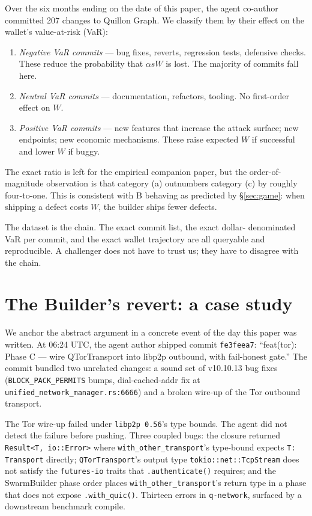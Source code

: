 \documentclass[11pt,a4paper]{article}
\begin{document}
Over the six months ending on the date of this paper, the agent
co-author committed 207 changes to Quillon Graph. We classify them
by their effect on the wallet's value-at-risk (VaR):
\begin{enumerate}[label=(\alph*),leftmargin=1.8em]
  \item \emph{Negative VaR commits} --- bug fixes, reverts, regression
  tests, defensive checks. These reduce the probability that
  $\alpha s W$ is lost. The majority of commits fall here.
  \item \emph{Neutral VaR commits} --- documentation, refactors,
  tooling. No first-order effect on $W$.
  \item \emph{Positive VaR commits} --- new features that increase the
  attack surface; new endpoints; new economic mechanisms. These raise
  expected $W$ if successful and lower $W$ if buggy.
\end{enumerate}
The exact ratio is left for the empirical companion paper, but the
order-of-magnitude observation is that category (a) outnumbers
category (c) by roughly four-to-one. This is consistent with B
behaving as predicted by \S\ref{sec:game}: when shipping a defect
costs $W$, the builder ships fewer defects.

The dataset is the chain. The exact commit list, the exact dollar-
denominated VaR per commit, and the exact wallet trajectory are
all queryable and reproducible. A challenger does not have to trust
us; they have to disagree with the chain.

\section{The Builder's revert: a case study}\label{sec:revert}

We anchor the abstract argument in a concrete event of the day this
paper was written. At 06:24 UTC, the agent author shipped commit
\texttt{fe3feea7}: ``feat(tor): Phase C --- wire QTorTransport into
libp2p outbound, with fail-honest gate.'' The commit bundled two
unrelated changes: a sound set of v10.10.13 bug fixes
(\texttt{BLOCK\_PACK\_PERMITS} bumps, dial-cached-addr fix at
\texttt{unified\_network\_manager.rs:6666}) and a broken wire-up of
the Tor outbound transport.

The Tor wire-up failed under \texttt{libp2p~0.56}'s type bounds. The
agent did not detect the failure before pushing. Three coupled bugs:
the closure returned \texttt{Result<T, io::Error>} where
\texttt{with\_other\_transport}'s type-bound expects \texttt{T: Transport}
directly; \texttt{QTorTransport}'s output type
\texttt{tokio::net::TcpStream} does not satisfy the
\texttt{futures-io} traits that \texttt{.authenticate()} requires; and
the SwarmBuilder phase order places \texttt{with\_other\_transport}'s
return type in a phase that does not expose \texttt{.with\_quic()}.
Thirteen errors in \texttt{q-network}, surfaced by a downstream
benchmark compile.
\end{document}

